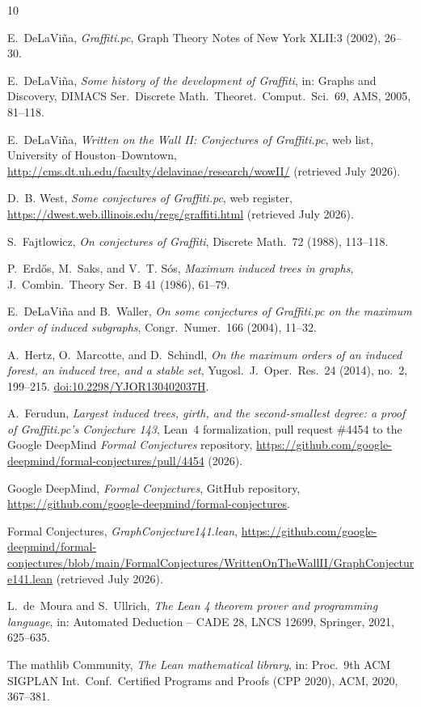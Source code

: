 \documentclass[11pt]{article}
\numberwithin{equation}{section}
\theoremstyle{remark}
\begin{document}
\begin{thebibliography}{10}

E.~DeLaVi\~na,
\emph{Graffiti.pc},
Graph Theory Notes of New York XLII:3 (2002), 26--30.

E.~DeLaVi\~na,
\emph{Some history of the development of Graffiti},
in: Graphs and Discovery, DIMACS Ser.\ Discrete Math.\ Theoret.\ Comput.\
Sci.\ 69, AMS, 2005, 81--118.

E.~DeLaVi\~na,
\emph{Written on the Wall II: Conjectures of Graffiti.pc},
web list, University of Houston--Downtown,
\url{http://cms.dt.uh.edu/faculty/delavinae/research/wowII/} (retrieved July
2026).

D.~B. West,
\emph{Some conjectures of Graffiti.pc},
web register,
\url{https://dwest.web.illinois.edu/regs/graffiti.html} (retrieved July
2026).

S.~Fajtlowicz,
\emph{On conjectures of Graffiti},
Discrete Math.\ 72 (1988), 113--118.

P.~Erd\H{o}s, M.~Saks, and V.~T. S\'os,
\emph{Maximum induced trees in graphs},
J.~Combin.\ Theory Ser.\ B 41 (1986), 61--79.

E.~DeLaVi\~na and B.~Waller,
\emph{On some conjectures of Graffiti.pc on the maximum order of induced
subgraphs},
Congr.\ Numer.\ 166 (2004), 11--32.

A.~Hertz, O.~Marcotte, and D.~Schindl,
\emph{On the maximum orders of an induced forest, an induced tree, and a
stable set},
Yugosl.\ J.\ Oper.\ Res.\ 24 (2014), no.~2, 199--215.
\href{https://doi.org/10.2298/YJOR130402037H}{doi:10.2298/YJOR130402037H}.

A.~Ferudun,
\emph{Largest induced trees, girth, and the second-smallest degree: a proof
of Graffiti.pc's Conjecture 143},
Lean~4 formalization, pull request \#4454 to the Google DeepMind
\emph{Formal Conjectures} repository,
\url{https://github.com/google-deepmind/formal-conjectures/pull/4454}
(2026).

Google DeepMind,
\emph{Formal Conjectures},
GitHub repository,
\url{https://github.com/google-deepmind/formal-conjectures}.

Formal Conjectures,
\emph{GraphConjecture141.lean},
\url{https://github.com/google-deepmind/formal-conjectures/blob/main/FormalConjectures/WrittenOnTheWallII/GraphConjecture141.lean}
(retrieved July 2026).

L.~de~Moura and S.~Ullrich,
\emph{The Lean 4 theorem prover and programming language},
in: Automated Deduction -- CADE 28, LNCS 12699, Springer, 2021, 625--635.

The mathlib Community,
\emph{The Lean mathematical library},
in: Proc.\ 9th ACM SIGPLAN Int.\ Conf.\ Certified Programs and Proofs
(CPP 2020), ACM, 2020, 367--381.

\end{thebibliography}
\end{document}
